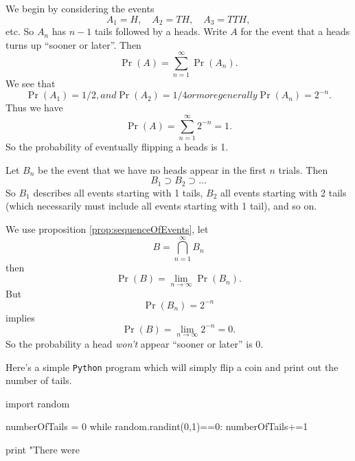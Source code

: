 We begin by considering the events
\begin{equation}
A_{1}=H,\quad A_{2}=TH,\quad A_{3}=TTH,
\end{equation}
etc. So $A_{n}$ has $n-1$ tails followed by a heads. Write $A$ for the
event that a heads turns up ``sooner or later''. Then
\begin{equation}
\Pr(A)=\sum_{n=1}^{\infty}\Pr(A_{n}).
\end{equation}
We see that
\begin{subequations}
\begin{equation}
\Pr(A_{1})=1/2,
\end{equation}
and
\begin{equation}
\Pr(A_{2})=1/4
\end{equation}
or more generally
\begin{equation}
\Pr(A_{n})=2^{-n}.
\end{equation}
\end{subequations}
Thus we have
\begin{equation}
\Pr(A)=\sum^{\infty}_{n=1}2^{-n}=1.
\end{equation}
So the probability of eventually flipping a heads is 1.

Let $B_{n}$ be the event that we have no heads appear in the first $n$
trials. Then
\begin{equation}
B_{1}\supset B_{2}\supset\dots
\end{equation}
So $B_{1}$ describes all events starting with 1 tails, $B_{2}$ all
events starting with 2 tails (which necessarily must include all events
starting with 1 tail), and so on.

We use proposition \ref{prop:sequenceOfEvents}, let
\begin{equation}
B=\bigcap^{\infty}_{n=1}B_{n}
\end{equation}
then
\begin{equation}
\Pr(B)=\lim_{n\to\infty}\Pr(B_{n}).
\end{equation}
But
\begin{equation}
\Pr(B_{n})=2^{-n}
\end{equation}
implies
\begin{equation}
\Pr(B)=\lim_{n\to\infty}2^{-n}=0.
\end{equation}
So the probability a head \emph{won't} appear ``sooner or later'' is 0. 

Here's a simple {\tt Python} program which will simply flip a coin and print
out the number of tails.

\begin{python}
import random

numberOfTails = 0
while random.randint(0,1)==0:
    numberOfTails+=1
    
print "There were %
\end{python}


